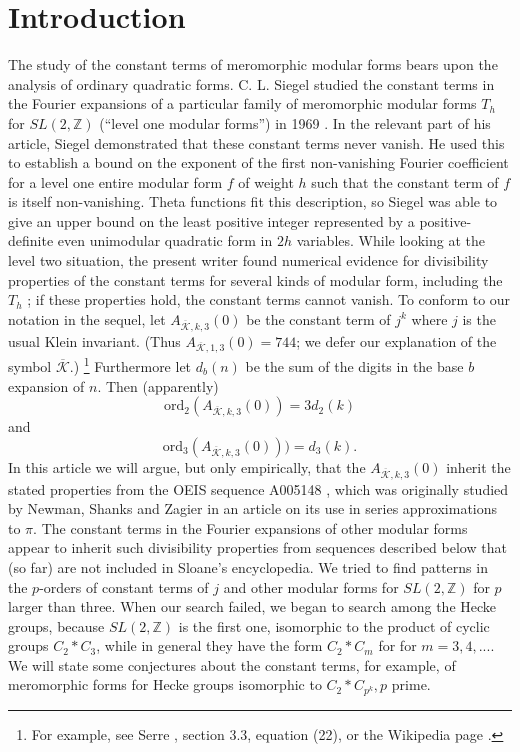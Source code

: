 \documentclass{article}
\begin{document}
\section{Introduction}
The study of the 
constant terms of meromorphic modular forms
bears upon the analysis  of ordinary 
quadratic forms.
C. L. Siegel studied the constant terms in the
Fourier expansions of a particular family 
of meromorphic modular forms $T_h$ for
$SL(2,\mathbb{Z})$ (``level one modular forms'') 
in 1969
\cite{siegel1969berechnung, siegel1980evaluation}.
In the relevant 
part of his article, Siegel
demonstrated that these constant terms never vanish.
He used this to 
establish a bound on 
the exponent of the first non-vanishing Fourier 
coefficient for
a level one entire modular form $f$ of weight 
$h$ such that the
constant term of $f$ is itself non-vanishing. 
Theta 
functions fit this description, so Siegel 
was able to give an upper 
bound on the least positive integer 
represented by a positive-definite
even unimodular quadratic form in $2h$ variables.
\newline \newline \noindent
While looking at the level two situation,
the present writer found 
numerical evidence for
divisibility properties of the constant terms 
for several kinds of modular form, including 
the $T_h$ \cite{brent1998quadratic}; 
if these properties hold, the constant terms 
cannot vanish. 
To conform to our notation in the sequel,
let $A_{\overline{\mathcal{K}},k,3}(0)$ 
be the constant
term of $j^k$ where $j$ is the usual  
Klein invariant. 
(Thus $A_{\overline{\mathcal{K}},1,3}(0) = 744$;
we defer our explanation of the symbol 
$\overline{\mathcal{K}}$.)
\footnote{For example, see Serre \cite{serre1970course}, 
section 3.3, equation (22), or the Wikipedia page
\cite{jWiki}.}
Furthermore let $d_b(n)$ be the sum of the digits in 
the base $b$
expansion of $n$. Then (apparently) 
$$\text{ord}_2(A_{\overline{\mathcal{K}},k,3}(0)) 
= 3d_2(k)$$
and $$\text{ord}_3(A_{\overline{\mathcal{K}},k,3}(0))) = 
d_3(k).$$ 
In this 
article we will argue, but only
empirically, that the $A_{\overline{\mathcal{K}},k,3}(0)$ 
inherit the stated properties from the 
OEIS sequence A005148 \cite{OEISNewmanShanks},
which was originally studied by Newman, Shanks
and Zagier
\cite{newman2004sequence, 
newman2004sequenceAppendix}
in an article on its use in series 
approximations to $\pi$. The constant terms
in the Fourier expansions of other modular
forms appear to inherit such divisibility 
properties from sequences described below
that (so far) are not included in 
Sloane's encyclopedia.
\newline \newline \noindent
We tried 
to find patterns in the
$p$-orders of constant terms of 
$j$ and other modular forms for
$SL(2,\mathbb{Z})$ for $p$ larger than three.
When our search failed, we 
began to search among the  Hecke groups,
because $SL(2,\mathbb{Z})$ is the first one, 
isomorphic to the product of
cyclic groups $C_2*C_3$,
while in general they 
have the form $C_2*C_m$ for 
for $m = 3, 4, ....$
We will state some conjectures
about the constant terms, for example, of
meromorphic forms for
Hecke groups isomorphic to $C_2*C_{p^k}, p$
prime.
\end{document}
